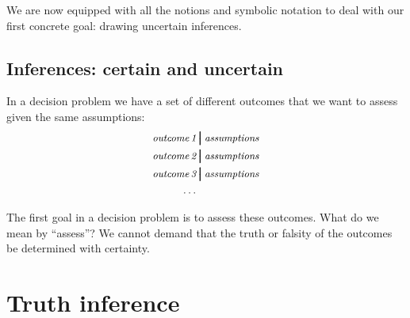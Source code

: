 \documentclass[
  a4paper,
  DIV=11,
  numbers=noendperiod,
  oneside]{scrreprt}
\begin{document}
\hfill\break

We are now equipped with all the notions and symbolic notation to deal
with our first concrete goal: drawing uncertain inferences.

\hypertarget{inferences-certain-and-uncertain}{%
\section{Inferences: certain and
uncertain}\label{inferences-certain-and-uncertain}}

In a decision problem we have a set of different outcomes that we want
to assess given the same assumptions: \[\begin{aligned}
\textit{\small outcome\,1} &\pmb{\nonscript\:\big\vert\nonscript\:\mathopen{}} \textit{\small assumptions}
\\
\textit{\small outcome\,2} &\pmb{\nonscript\:\big\vert\nonscript\:\mathopen{}} \textit{\small assumptions}
\\
\textit{\small outcome\,3} &\pmb{\nonscript\:\big\vert\nonscript\:\mathopen{}} \textit{\small assumptions}
\\
\dotso&
\end{aligned}\]

The first goal in a decision problem is to assess these outcomes. What
do we mean by ``assess''? We cannot demand that the truth or falsity of
the outcomes be determined with certainty.

\hypertarget{sec-truth-inference}{%
\chapter{Truth inference}\label{sec-truth-inference}}

\providecommand{\ul}{\uline}
\renewcommand*{\|}[1][]{\nonscript\:#1\vert\nonscript\:\mathopen{}}
\providecommand*{\pr}[1]{\textsf{\small`#1'}}
\renewcommand*{\pr}[1]{\textsf{\small`#1'}}
\providecommand*{\prq}[1]{\textsf{\small #1}}
\renewcommand*{\prq}[1]{\textsf{\small #1}}
\providecommand{\se}[1]{\mathsfit{#1}}
\renewcommand{\se}[1]{\mathsfit{#1}}
\providecommand{\p}{\mathrm{p}}
\renewcommand{\p}{\mathrm{p}}
\renewcommand{\P}{\mathrm{P}}
\end{document}
